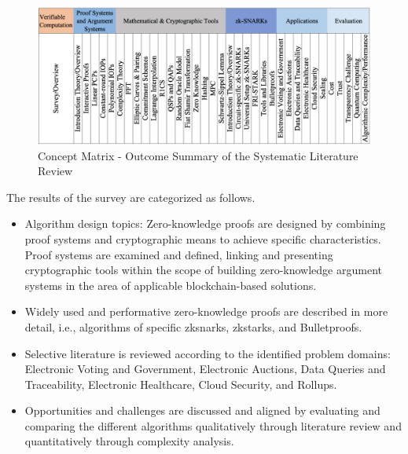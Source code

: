 \begin{figure}[hbt]
	\centering
	\includegraphics[width=1.0\textwidth]{Pictures/concept_matrix_headers.png}
	\caption{Concept Matrix - Outcome Summary of the Systematic Literature Review}
	\label{fig:concept_matrix}
\end{figure}

The results of the survey are categorized as follows. 
\begin{itemize}
    \item Algorithm design topics: Zero-knowledge proofs are designed by combining proof systems and cryptographic means to achieve specific characteristics. Proof systems are examined and defined, linking and presenting cryptographic tools within the scope of building zero-knowledge argument systems in the area of applicable blockchain-based solutions.
    \item Widely used and performative zero-knowledge proofs are described in more detail, i.e., algorithms of specific \acrshort{zksnark}s, \acrshort{zkstark}s, and Bulletproofs.
    \item Selective literature is reviewed according to the identified problem domains: Electronic Voting and Government, Electronic Auctions, Data Queries and Traceability, Electronic Healthcare, Cloud Security, and Rollups.
    \item Opportunities and challenges are discussed and aligned by evaluating and comparing the different algorithms qualitatively through literature review and quantitatively through complexity analysis.
\end{itemize}

